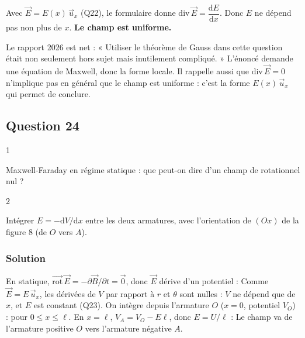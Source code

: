 \documentclass[11pt,a4paper]{article}
\newcommand{\equationajustee}[1]{%
  \sbox{\boiteequation}{$\displaystyle #1$}%
  \ifdim\wd\boiteequation>\linewidth
    \[\resizebox{\linewidth}{!}{\usebox{\boiteequation}}\]%
  \else
    \[#1\]%
  \fi}
\begin{document}
Avec \(\vec E=E(x)\,\vec u_x\) (Q22), le formulaire donne \(\mathrm{div}\,\vec E=\dfrac{\mathrm dE}{\mathrm dx}\). Donc \(E\) ne dépend pas non plus de \(x\). \textbf{Le champ est uniforme.}

\begin{jury}

Le rapport 2026 est net : « Utiliser le théorème de Gauss dans cette question était non seulement hors sujet mais inutilement compliqué. » L'énoncé demande une équation de Maxwell, donc la forme locale. Il rappelle aussi que \(\mathrm{div}\,\vec E=0\) n'implique pas en général que le champ est uniforme : c'est la forme \(E(x)\,\vec u_x\) qui permet de conclure.

\end{jury}

\hypertarget{question-24}{%
\subsection{Question 24}\label{question-24}}

\begin{indication}{1}

Maxwell-Faraday en régime statique : que peut-on dire d'un champ de rotationnel nul ?

\end{indication}

\begin{indication}{2}

Intégrer \(E=-\mathrm dV/\mathrm dx\) entre les deux armatures, avec l'orientation de \((Ox)\) de la figure 8 (de \(O\) vers \(A\)).

\end{indication}

\hypertarget{solution-23}{%
\subsubsection{Solution}\label{solution-23}}

En statique, \(\overrightarrow{\mathrm{rot}}\,\vec E=-\partial\vec B/\partial t=\vec0\), donc \(\vec E\) dérive d'un potentiel :
\equationajustee{\boxed{\vec E=-\overrightarrow{\mathrm{grad}}\,V}}
Comme \(\vec E=E\,\vec u_x\), les dérivées de \(V\) par rapport à \(r\) et \(\theta\) sont nulles : \(V\) ne dépend que de \(x\), et
\equationajustee{\frac{\mathrm dV}{\mathrm dx}=-E .}
\(E\) est constant (Q23). On intègre depuis l'armature \(O\) (\(x=0\), potentiel \(V_O\)) :
\equationajustee{V(x)=V_O-Ex}
pour \(0\le x\le\ell\). En \(x=\ell\), \(V_A=V_O-E\ell\), donc \(E=U/\ell\) :
\equationajustee{\boxed{\vec E=\frac{U}{\ell}\vec u_x}}
Le champ va de l'armature positive \(O\) vers l'armature négative \(A\).
\end{document}
